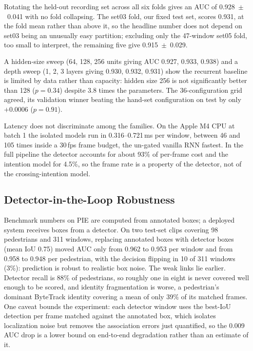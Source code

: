 \documentclass[mti,article,submit,moreauthors]{Definitions/mdpi}
\begin{document}
Rotating the held-out recording set across all six folds gives an AUC of 0.928~$\pm$~0.041 with no fold collapsing. The set03 fold, our fixed test set, scores 0.931, at the fold mean rather than above it, so the headline number does not depend on set03 being an unusually easy partition; excluding only the 47-window set05 fold, too small to interpret, the remaining five give 0.915~$\pm$~0.029.

A hidden-size sweep (64, 128, 256 units giving AUC 0.927, 0.933, 0.938) and a depth sweep (1, 2, 3 layers giving 0.930, 0.932, 0.931) show the recurrent baseline is limited by data rather than capacity: hidden size 256 is not significantly better than 128 ($p = 0.34$) despite 3.8 times the parameters. The 36-configuration grid agreed, its validation winner beating the hand-set configuration on test by only $+0.0006$ ($p = 0.91$).

Latency does not discriminate among the families. On the Apple M4 CPU at batch 1 the isolated models run in 0.316--0.721\,ms per window, between 46 and 105 times inside a 30\,fps frame budget, the un-gated vanilla RNN fastest. In the full pipeline the detector accounts for about 93\% of per-frame cost and the intention model for 4.5\%, so the frame rate is a property of the detector, not of the crossing-intention model.

\subsection{Detector-in-the-Loop Robustness}
\label{sec:detector}

Benchmark numbers on PIE are computed from annotated boxes; a deployed system receives boxes from a detector. On two test-set clips covering 98 pedestrians and 311 windows, replacing annotated boxes with detector boxes (mean IoU 0.75) moved AUC only from 0.962 to 0.953 per window and from 0.958 to 0.948 per pedestrian, with the decision flipping in 10 of 311 windows (3\%): prediction is robust to realistic box noise. The weak links lie earlier. Detector recall is 88\% of pedestrians, so roughly one in eight is never covered well enough to be scored, and identity fragmentation is worse, a pedestrian's dominant ByteTrack identity covering a mean of only 39\% of its matched frames. One caveat bounds the experiment: each detector window uses the best-IoU detection per frame matched against the annotated box, which isolates localization noise but removes the association errors just quantified, so the 0.009 AUC drop is a lower bound on end-to-end degradation rather than an estimate of it.
\end{document}
